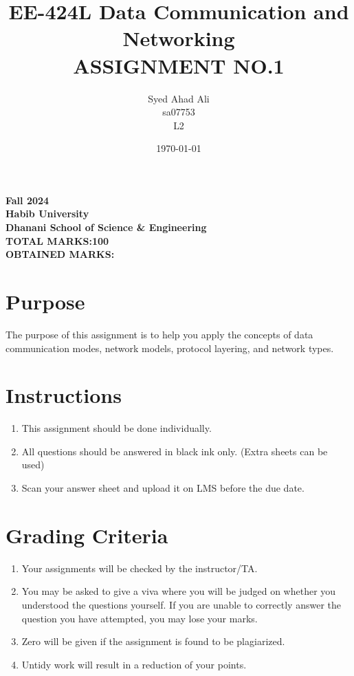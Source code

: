 \documentclass[a4paper]{exam}
\title{EE-424L Data Communication and Networking\\
ASSIGNMENT NO.1}
\author{Syed Ahad Ali\\
sa07753\\
L2}
\date{\today}
\begin{document}
    \maketitle

    \begin{center}
        \textbf{Fall 2024}\\
        \textbf{Habib University}\\
        \textbf{Dhanani School of Science \& Engineering}\\
        \textbf{TOTAL MARKS:100}\\
        \textbf{OBTAINED MARKS:}
    \end{center}


    \section*{Purpose}
    The purpose of this assignment is to help you apply the concepts of data communication modes, network models, protocol layering, and network types.

    \section*{Instructions}
    \begin{enumerate}
        \item This assignment should be done individually.
        \item All questions should be answered in black ink only. (Extra sheets can be used)
        \item Scan your answer sheet and upload it on LMS before the due date.
    \end{enumerate}

    \section*{Grading Criteria}
    \begin{enumerate}
        \item Your assignments will be checked by the instructor/TA.
        \item You may be asked to give a viva where you will be judged on whether you understood the questions yourself. If you are unable to correctly answer the question you have attempted, you may lose your marks.
        \item Zero will be given if the assignment is found to be plagiarized.
        \item Untidy work will result in a reduction of your points.
    \end{enumerate}
\end{document}
